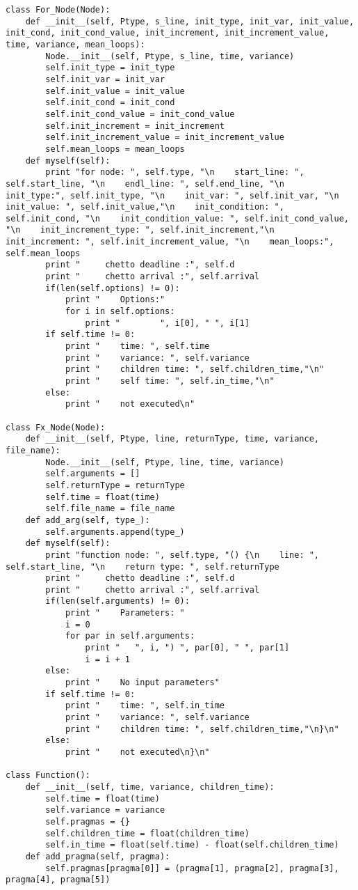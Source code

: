 \documentclass[a4paper,11pt,twoside]{book}
\begin{document}
\begin{lstlisting}[language=CCC, caption=pargraph.py]
class For_Node(Node): 
    def __init__(self, Ptype, s_line, init_type, init_var, init_value, init_cond, init_cond_value, init_increment, init_increment_value, time, variance, mean_loops):
        Node.__init__(self, Ptype, s_line, time, variance)
        self.init_type = init_type
        self.init_var = init_var
        self.init_value = init_value
        self.init_cond = init_cond
        self.init_cond_value = init_cond_value
        self.init_increment = init_increment
        self.init_increment_value = init_increment_value
        self.mean_loops = mean_loops
    def myself(self):
		print "for node: ", self.type, "\n    start_line: ", self.start_line, "\n    endl_line: ", self.end_line, "\n    init_type:", self.init_type, "\n    init_var: ", self.init_var, "\n    init_value: ", self.init_value,"\n    init_condition: ", self.init_cond, "\n    init_condition_value: ", self.init_cond_value, "\n    init_increment_type: ", self.init_increment,"\n    init_increment: ", self.init_increment_value, "\n    mean_loops:", self.mean_loops
		print "     chetto deadline :", self.d
		print "     chetto arrival :", self.arrival
		if(len(self.options) != 0):
			print "    Options:"
			for i in self.options:
				print "        ", i[0], " ", i[1]
		if self.time != 0:
			print "    time: ", self.time
			print "    variance: ", self.variance
			print "    children time: ", self.children_time,"\n"
			print "    self time: ", self.in_time,"\n"
		else:
			print "    not executed\n"

class Fx_Node(Node):
	def __init__(self, Ptype, line, returnType, time, variance, file_name):
		Node.__init__(self, Ptype, line, time, variance)
		self.arguments = []
		self.returnType = returnType
		self.time = float(time)
		self.file_name = file_name
	def add_arg(self, type_):
		self.arguments.append(type_)
	def myself(self):
		print "function node: ", self.type, "() {\n    line: ", self.start_line, "\n    return type: ", self.returnType
		print "     chetto deadline :", self.d
		print "     chetto arrival :", self.arrival
		if(len(self.arguments) != 0):
			print "    Parameters: "
			i = 0
			for par in self.arguments:
				print "   ", i, ") ", par[0], " ", par[1]
				i = i + 1
		else:
			print "    No input parameters"
		if self.time != 0:
			print "    time: ", self.in_time
			print "    variance: ", self.variance
			print "    children time: ", self.children_time,"\n}\n"
		else:
			print "    not executed\n}\n"

class Function():
	def __init__(self, time, variance, children_time):
		self.time = float(time)
		self.variance = variance
		self.pragmas = {}
		self.children_time = float(children_time)
		self.in_time = float(self.time) - float(self.children_time)
	def add_pragma(self, pragma):
		self.pragmas[pragma[0]] = (pragma[1], pragma[2], pragma[3], pragma[4], pragma[5])


\end{lstlisting}
\end{document}
